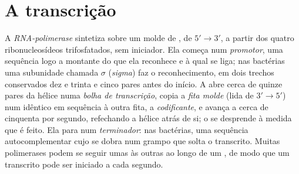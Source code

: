 \section{A transcrição}

\begin{definition}\label{def:b1:gene-expression:transcription}
A \emph{RNA-polimerase} sintetiza  sobre um molde de , de
$5' \to 3'$, a partir dos quatro ribonucleosídeos trifosfatados, sem
iniciador. Ela começa num \emph{promotor}, uma sequência logo a montante
do  que ela reconhece e à qual se liga; nas bactérias uma subunidade
chamada $\sigma$ (\emph{sigma}) faz o reconhecimento, em dois trechos
conservados dez e trinta e cinco pares antes do início. A  abre
cerca de quinze pares da hélice numa \emph{bolha de transcrição}, copia
a \emph{fita molde} (lida de $3' \to 5'$) num  idêntico em sequência
à outra fita, a \emph{codificante}, e avança a cerca de cinquenta
 por segundo, refechando a hélice atrás de si; o  se
desprende à medida que é feito. Ela para num \emph{terminador}: nas
bactérias, uma sequência autocomplementar cujo  se dobra num grampo
que solta o transcrito. Muitas polimerases podem se seguir umas às
outras ao longo de um , de modo que um transcrito pode ser iniciado
a cada segundo.
\end{definition}

